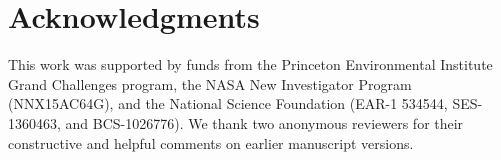 \documentclass[a4paper]{article}
\begin{document}
\vspace{-0.3 cm}
\section*{Acknowledgments}
\vspace{-0.2 cm}
This work was supported by funds from the Princeton Environmental Institute Grand Challenges program, the NASA New Investigator Program (NNX15AC64G), and the National Science Foundation (EAR-1 534544, SES-1360463, and BCS-1026776). We  thank two anonymous reviewers for their constructive and helpful comments on earlier manuscript versions. 

 
{\footnotesize }

\end{document}
